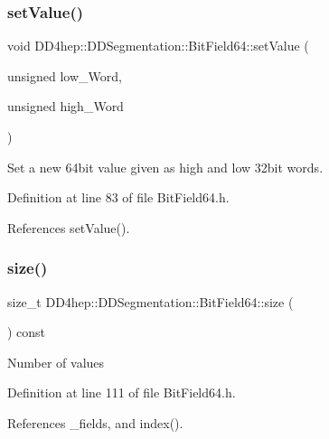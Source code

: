 \subsubsection{\texorpdfstring{set\+Value()}{setValue()}\hspace{0.1cm}{\footnotesize\ttfamily [2/2]}}
{\footnotesize\ttfamily void D\+D4hep\+::\+D\+D\+Segmentation\+::\+Bit\+Field64\+::set\+Value (\begin{DoxyParamCaption}\item[{unsigned}]{low\+\_\+\+Word,  }\item[{unsigned}]{high\+\_\+\+Word }\end{DoxyParamCaption})\hspace{0.3cm}{\ttfamily [inline]}}

Set a new 64bit value given as high and low 32bit words. 

Definition at line 83 of file Bit\+Field64.\+h.



References set\+Value().

\hypertarget{class_d_d4hep_1_1_d_d_segmentation_1_1_bit_field64_a80ebc3a5fa4f1b961c28bdda5fd528bc}{}\label{class_d_d4hep_1_1_d_d_segmentation_1_1_bit_field64_a80ebc3a5fa4f1b961c28bdda5fd528bc} 
\subsubsection{\texorpdfstring{size()}{size()}}
{\footnotesize\ttfamily size\+\_\+t D\+D4hep\+::\+D\+D\+Segmentation\+::\+Bit\+Field64\+::size (\begin{DoxyParamCaption}{ }\end{DoxyParamCaption}) const\hspace{0.3cm}{\ttfamily [inline]}}

Number of values 

Definition at line 111 of file Bit\+Field64.\+h.



References \+\_\+fields, and index().

\hypertarget{class_d_d4hep_1_1_d_d_segmentation_1_1_bit_field64_a6e50422181dc55535e27740b8020345d}{}\label{class_d_d4hep_1_1_d_d_segmentation_1_1_bit_field64_a6e50422181dc55535e27740b8020345d} 
